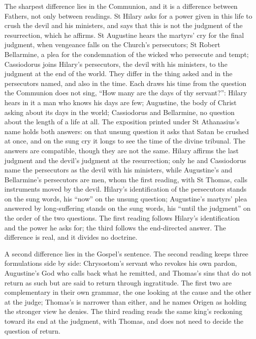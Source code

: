 The sharpest difference lies in the Communion, and it is a difference between
Fathers, not only between readings. St Hilary asks for a power given in this life
to crush the devil and his ministers, and says that this is not the judgment of
the resurrection, which he affirms. St Augustine hears the martyrs' cry for the
final judgment, when vengeance falls on the Church's persecutors; St Robert
Bellarmine, a plea for the condemnation of the wicked who persecute and tempt;
Cassiodorus joins Hilary's persecutors, the devil with his ministers, to the
judgment at the end of the world. They differ in the thing asked and in the
persecutors named, and also in the time. Each draws
his time from the question the Communion does not sing, ``How many are the days of
thy servant?'': Hilary hears in it a man who knows his days are few; Augustine,
the body of Christ asking about its days in the world; Cassiodorus and Bellarmine,
no question about the length of a life at all. The exposition printed under St
Athanasius's name holds both answers: on that unsung question it asks that Satan
be crushed at once, and on the sung cry it longs to see the time of the divine
tribunal. The answers are compatible, though they are not the same. Hilary
affirms the last judgment and the devil's judgment at the resurrection; only he
and Cassiodorus name the persecutors as the devil with his ministers, while
Augustine's and Bellarmine's persecutors are men, whom the first reading, with St
Thomas, calls instruments moved by the devil. Hilary's identification of the
persecutors stands on the sung words, his ``now'' on the unsung question;
Augustine's martyrs' plea answered by long-suffering stands on the sung words, his
``until the judgment'' on the order of the two questions. The first reading
follows Hilary's identification and the power he asks for; the third follows the
end-directed answer. The difference is real, and it divides no doctrine.

A second difference lies in the Gospel's sentence. The second reading keeps three
formulations side by side: Chrysostom's servant who revokes his own pardon,
Augustine's God who calls back what he remitted, and Thomas's sins that do not
return as such but are said to return through ingratitude. The first two are
complementary in their own grammar, the one looking at the cause and the other at
the judge; Thomas's is narrower than either, and he names Origen as holding the
stronger view he denies. The third reading reads the same king's reckoning toward
its end at the judgment, with Thomas, and does not need to decide the question of
return.

